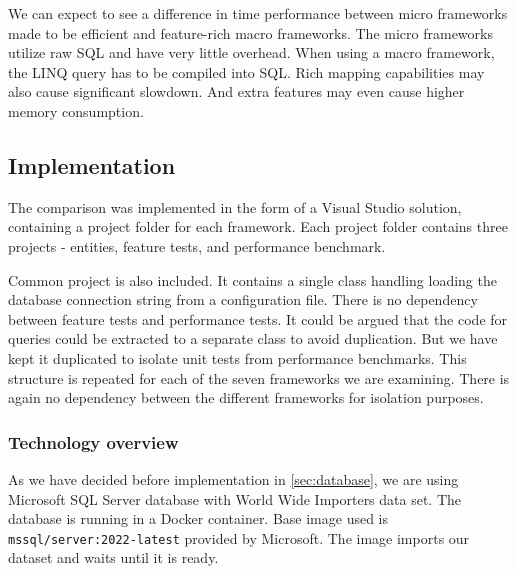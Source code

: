 We can expect to see a difference in time performance between micro frameworks made to be efficient and feature-rich macro frameworks.
The micro frameworks utilize raw SQL and have very little overhead. When using a macro framework, the LINQ query has to be compiled into SQL. Rich mapping capabilities may also cause significant slowdown. And extra features may even cause higher memory consumption.

\subsection{Implementation}
The comparison was implemented in the form of a Visual Studio solution, containing a project folder for each framework. Each project folder contains three projects - entities, feature tests, and performance benchmark. 


\usetikzlibrary{positioning, arrows}
\begin{center}
\end{center}

Common project is also included. It contains a single class handling loading the database connection string from a configuration file. There is no dependency between feature tests and performance tests. It could be argued that the code for queries could be extracted to a separate class to avoid duplication. But we have kept it duplicated to isolate unit tests from performance benchmarks. This structure is repeated for each of the seven frameworks we are examining. There is again no dependency between the different frameworks for isolation purposes.

\subsubsection{Technology overview}
As we have decided before implementation in \autoref{sec:database}, we are using Microsoft SQL Server database with World Wide Importers data set. The database is running in a Docker container. Base image used is \texttt{mssql/server:2022-latest}\cite{mssqlDocker} provided by Microsoft. The image imports our dataset and waits until it is ready.


